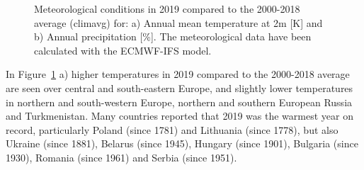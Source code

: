 \begin{figure}[h]
  \caption{Meteorological conditions in 2019 compared to the 2000-2018 average (climavg) for: a) Annual mean temperature at 2m [K] and b) Annual precipitation [\%]. The meteorological data have been calculated with the ECMWF-IFS model.}
\label{fig:metyear-avMET}
\end{figure}

In Figure~\ref{fig:metyear-avMET} a) higher temperatures in 2019 compared to the 2000-2018 average are seen over central and south-eastern Europe, and slightly lower temperatures in northern and south-western Europe, northern and southern European Russia and Turkmenistan. Many countries reported that 2019 was the warmest year on record, particularly Poland (since 1781) and Lithuania (since 1778), but also Ukraine (since 1881), Belarus (since 1945), Hungary (since 1901), Bulgaria (since 1930), Romania (since 1961) and Serbia (since 1951).

